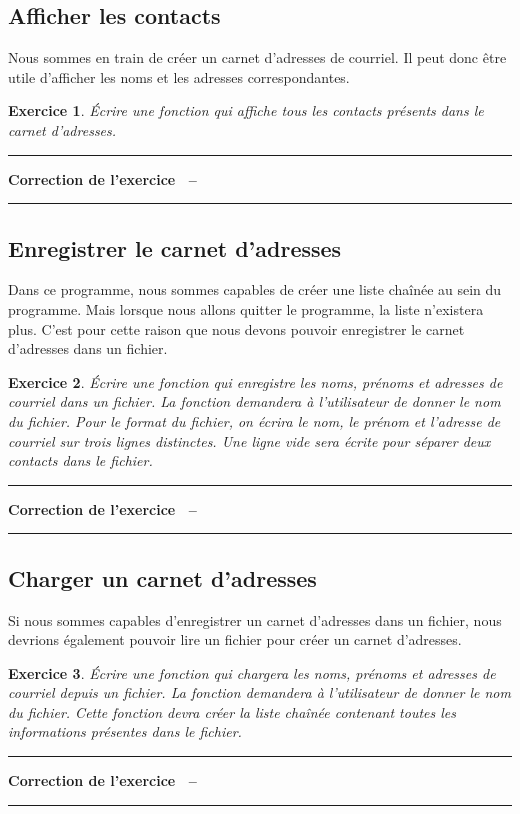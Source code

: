 \documentclass[a4paper]{article}
\newenvironment{Correction}{\par\tiny\blue\rule[1ex]{\textwidth}{1pt}\par\normalsize\textbf{Correction de l'exercice~\theExo{} -- }}{\par\tiny\blue\rule[1ex]{\textwidth}{1pt}\par}
\newtheorem{Exo}{Exercice}
\begin{document}
		\subsection{Afficher les contacts}
			Nous sommes en train de créer un carnet d'adresses de courriel.
			Il peut donc être utile d'afficher les noms et les adresses correspondantes.
			\begin{Exo}
				Écrire une fonction qui affiche tous les contacts présents dans le carnet d'adresses.
			\end{Exo}
			\begin{Correction}
			\end{Correction}
		\subsection{Enregistrer le carnet d'adresses}
			Dans ce programme, nous sommes capables de créer une liste chaînée au sein du programme.
			Mais lorsque nous allons quitter le programme, la liste n'existera plus.
			C'est pour cette raison que nous devons pouvoir enregistrer le carnet d'adresses dans un fichier.
			\begin{Exo}
				Écrire une fonction qui enregistre les noms, prénoms et adresses de courriel dans un fichier.
				La fonction demandera à l'utilisateur de donner le nom du fichier.
				Pour le format du fichier, on écrira le nom, le prénom et l'adresse de courriel sur trois lignes distinctes.
				Une ligne vide sera écrite pour séparer deux contacts dans le fichier.
			\end{Exo}
			\begin{Correction}
			\end{Correction}
		\subsection{Charger un carnet d'adresses}
			Si nous sommes capables d'enregistrer un carnet d'adresses dans un fichier, nous devrions également pouvoir lire un fichier pour créer un carnet d'adresses.
			\begin{Exo}
				Écrire une fonction qui chargera les noms, prénoms et adresses de courriel depuis un fichier.
				La fonction demandera à l'utilisateur de donner le nom du fichier.
				Cette fonction devra créer la liste chaînée contenant toutes les informations présentes dans le fichier.
			\end{Exo}
			\begin{Correction}
			\end{Correction}
\end{document}
